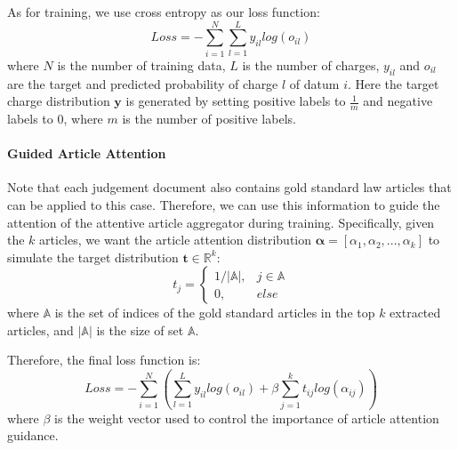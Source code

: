 As for training, we use cross entropy as our loss function:
\begin{equation}
\label{original_loss}
Loss= -\sum_{i=1}^N\sum_{l=1}^L{y_{il} log(o_{il})}
\end{equation} 
where $N$ is the number of training data, $L$ is the number of charges, $y_{il}$ and $o_{il}$ are the target and predicted probability of charge $l$ of datum $i$. Here the target charge distribution $\mathbf{y}$ is generated by setting positive labels to $\frac{1}{m}$ and negative labels to $0$, where $m$ is the number of positive labels.

\paragraph{Guided Article Attention}
Note that each judgement document also contains gold standard law articles that can be applied to this case. Therefore, we can use this information to guide the attention of the attentive article aggregator during training. Specifically, given the $k$ articles, we want the article attention distribution $\bm{\alpha}=[\alpha_1, \alpha_2, ..., \alpha_k]$ to simulate the target distribution $\mathbf{t}\in\mathbb{R}^k$: 
\begin{equation}
t_j=
\begin{cases}
1/|\mathbb{A}|,	& j\in \mathbb{A}\\
0,	& else
\end{cases}
\end{equation}
where $\mathbb{A}$ is the set of indices of the gold standard articles in the top $k$ extracted articles, and $|\mathbb{A}|$ is the size of set $\mathbb{A}$. 

Therefore, the final loss function is:
\begin{equation}
\label{final_loss}
Loss = -\sum_{i=1}^N(\sum_{l=1}^L{y_{il} log(o_{il})} + \beta \sum_{j=1}^k{t_{ij} log(\alpha_{ij})})
\end{equation}
where $\beta$ is the weight vector used to control the importance of article attention guidance.



